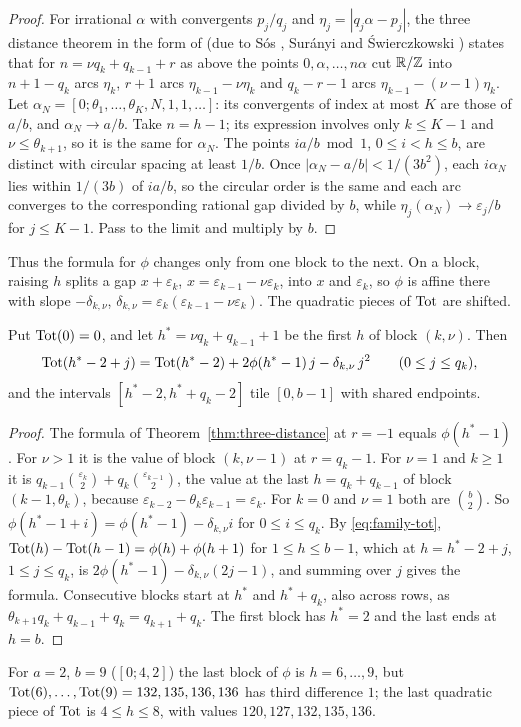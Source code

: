 \begin{proof}
For irrational $\alpha$ with convergents $p_j/q_j$ and $\eta_j=|q_j\alpha-p_j|$, the three distance theorem in the form of \cite[Sect.~3]{AlessandriBerthe1998} (due to S\'os \cite{Sos1958}, Sur\'anyi \cite{Suranyi1958} and \'Swierczkowski \cite{Swierczkowski1958}) states that for $n=\nu q_k+q_{k-1}+r$ as above the points $0,\alpha,\dots,n\alpha$ cut $\mathbb R/\mathbb{Z}$ into $n+1-q_k$ arcs $\eta_k$, $r+1$ arcs $\eta_{k-1}-\nu \eta_k$ and $q_k-r-1$ arcs $\eta_{k-1}-(\nu -1)\eta_k$. Let $\alpha_N=[0;\theta_1,\dots,\theta_K,N,1,1,\dots]$: its convergents of index at most $K$ are those of $a/b$, and $\alpha_N\to a/b$. Take $n=h-1$; its expression involves only $k\le K-1$ and $\nu \le \theta_{k+1}$, so it is the same for $\alpha_N$. The points $ia/b\bmod1$, $0\le i<h\le b$, are distinct with circular spacing at least $1/b$. Once $|\alpha_N-a/b|<1/(3b^2)$, each $i\alpha_N$ lies within $1/(3b)$ of $ia/b$, so the circular order is the same and each arc converges to the corresponding rational gap divided by $b$, while $\eta_j(\alpha_N)\to\varepsilon_j/b$ for $j\le K-1$. Pass to the limit and multiply by $b$.
\end{proof}

Thus the formula for $\phi$ changes only from one block to the next. On a block, raising $h$ splits a gap $x+\varepsilon_k$, $x=\varepsilon_{k-1}-\nu \varepsilon_k$, into $x$ and $\varepsilon_k$, so $\phi$ is affine there with slope $-\delta_{k,\nu }$, $\delta_{k,\nu }=\varepsilon_k(\varepsilon_{k-1}-\nu \varepsilon_k)$. The quadratic pieces of $\operatorname{Tot}$ are shifted.

\begin{corollary}\label{cor:quadratic-pieces}
Put $\operatorname{Tot}(0)=0$, and let $h^*=\nu q_k+q_{k-1}+1$ be the first $h$ of block $(k,\nu )$. Then
\[
\operatorname{Tot}(h^*-2+j)=\operatorname{Tot}(h^*-2)+2\phi(h^*-1)\,j-\delta_{k,\nu }\,j^2\qquad(0\le j\le q_k),
\]
and the intervals $[h^*-2,h^*+q_k-2]$ tile $[0,b-1]$ with shared endpoints.
\end{corollary}

\begin{proof}
The formula of Theorem~\ref{thm:three-distance} at $r=-1$ equals $\phi(h^*-1)$. For $\nu >1$ it is the value of block $(k,\nu -1)$ at $r=q_k-1$. For $\nu =1$ and $k\ge1$ it is $q_{k-1}\binom{\varepsilon_k}2+q_k\binom{\varepsilon_{k-1}}2$, the value at the last $h=q_k+q_{k-1}$ of block $(k-1,\theta_k)$, because $\varepsilon_{k-2}-\theta_k\varepsilon_{k-1}=\varepsilon_k$. For $k=0$ and $\nu =1$ both are $\binom b2$. So $\phi(h^*-1+i)=\phi(h^*-1)-\delta_{k,\nu }i$ for $0\le i\le q_k$. By \eqref{eq:family-tot}, $\operatorname{Tot}(h)-\operatorname{Tot}(h-1)=\phi(h)+\phi(h+1)$ for $1\le h\le b-1$, which at $h=h^*-2+j$, $1\le j\le q_k$, is $2\phi(h^*-1)-\delta_{k,\nu }(2j-1)$, and summing over $j$ gives the formula. Consecutive blocks start at $h^*$ and $h^*+q_k$, also across rows, as $\theta_{k+1}q_k+q_{k-1}+q_k=q_{k+1}+q_k$. The first block has $h^*=2$ and the last ends at $h=b$.
\end{proof}

For $a=2$, $b=9$ ($[0;4,2]$) the last block of $\phi$ is $h=6,\dots,9$, but $\operatorname{Tot}(6),\dots,\operatorname{Tot}(9)=132,135,136,136$ has third difference $1$; the last quadratic piece of $\operatorname{Tot}$ is $4\le h\le8$, with values $120,127,132,135,136$.
